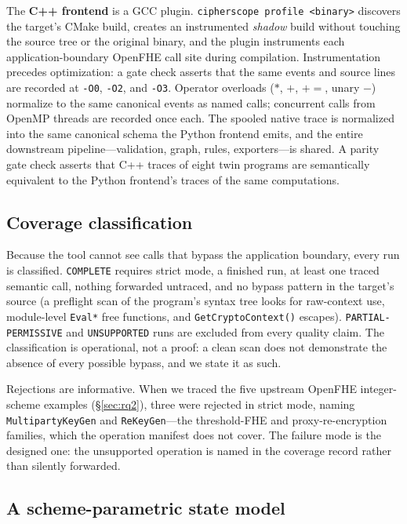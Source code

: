 \documentclass[sigconf,nonacm]{acmart}
\begin{document}
The \textbf{C++ frontend} is a GCC plugin. \texttt{cipherscope profile
<binary>} discovers the target's CMake build, creates an instrumented
\emph{shadow} build without touching the source tree or the original binary,
and the plugin instruments each application-boundary OpenFHE call site
during compilation. Instrumentation precedes optimization: a gate check
asserts that the same events and source lines are recorded at \texttt{-O0},
\texttt{-O2}, and \texttt{-O3}. Operator overloads ($*$, $+$, $+{=}$, unary
$-$) normalize to the same canonical events as named calls; concurrent calls
from OpenMP threads are recorded once each. The spooled native trace is
normalized into the same canonical schema the Python frontend emits, and the
entire downstream pipeline---validation, graph, rules, exporters---is
shared. A parity gate check asserts that C++ traces of eight twin programs
are semantically equivalent to the Python frontend's traces of the same
computations.

\subsection{Coverage classification}
\label{sec:coverage}

Because the tool cannot see calls that bypass the application boundary,
every run is classified. \texttt{COMPLETE} requires strict mode, a finished
run, at least one traced semantic call, nothing forwarded untraced, and no
bypass pattern in the target's source (a preflight scan of the program's
syntax tree looks for raw-context use, module-level \texttt{Eval*} free
functions, and \texttt{GetCryptoContext()} escapes).
\texttt{PARTIAL-PERMISSIVE} and \texttt{UNSUPPORTED} runs are excluded from
every quality claim. The classification is operational, not a proof: a clean
scan does not demonstrate the absence of every possible bypass, and we state
it as such.

Rejections are informative. When we traced the five upstream OpenFHE
integer-scheme examples (\S\ref{sec:rq2}), three were rejected in strict
mode, naming \texttt{MultipartyKeyGen} and \texttt{ReKeyGen}---the
threshold-FHE and proxy-re-encryption families, which the operation manifest
does not cover. The failure mode is the designed one: the unsupported
operation is named in the coverage record rather than silently forwarded.

\subsection{A scheme-parametric state model}
\label{sec:scheme}
\end{document}
